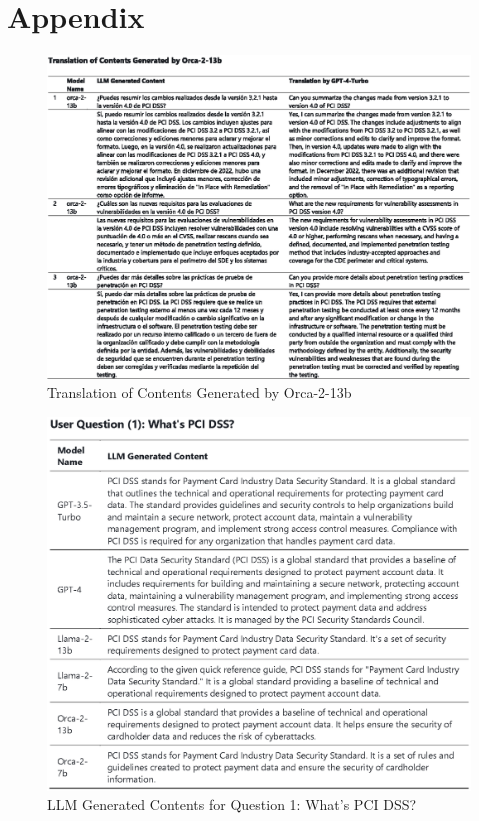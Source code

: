 \documentclass[runningheads]{llncs}
\begin{document}
%
%
%



\newpage
\appendix
\section{Appendix}

\begin{figure}
    \centering
    \includegraphics[width=1\linewidth]{figures/translation.eps}
    \caption{Translation of Contents Generated by Orca-2-13b}
    \label{fig:translation}
\end{figure}

\begin{figure}
    \centering
    \includegraphics[width=1\linewidth]{figures/question_1.eps}
    \caption{LLM Generated Contents for Question 1: What’s PCI DSS?}
    \label{fig:Question  1}
\end{figure}
\end{document}
